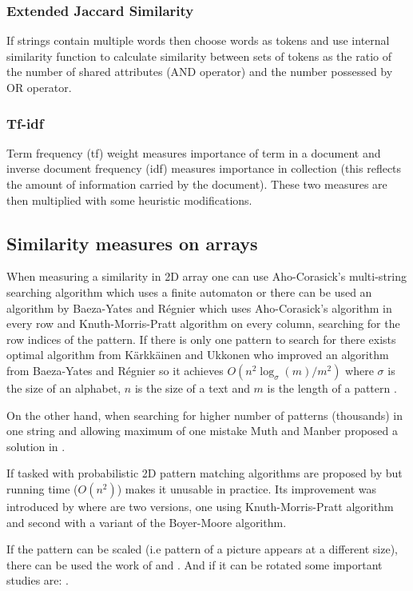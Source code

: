 \subsubsection{Extended Jaccard Similarity}
If strings contain multiple words then choose words as tokens and use internal similarity function to calculate similarity between sets of tokens as the ratio of the number of shared attributes (AND operator) and the number possessed by OR operator.
\subsubsection{Tf-idf}
Term frequency (tf) weight measures importance of term in a document and inverse document frequency (idf) measures importance in collection (this reflects the amount of information carried by the document). These two measures are then multiplied with some heuristic modifications.

\subsection{Similarity measures on arrays}
When measuring a similarity in 2D array one can use Aho-Corasick's multi-string searching algorithm \cite{ahocor} which uses a finite automaton or there can be used an algorithm by Baeza-Yates and R{\' e}gnier \cite{baeza1993fast} which uses Aho-Corasick's algorithm in every row and Knuth-Morris-Pratt algorithm on every column, searching for the row indices of the pattern. If there is only one pattern to search for there exists optimal algorithm from K{\"a}rkk{\"a}inen and Ukkonen who improved an algorithm from Baeza-Yates and R{\' e}gnier so it achieves $O(n^2 \log_\sigma (m) / m^2)$ where $\sigma$ is the size of an alphabet, $n$ is the size of a text and $m$ is the length of a pattern \cite{karkoptimal}. 

On the other hand, when searching for higher number of patterns (thousands) in one string and allowing maximum of one mistake Muth and Manber proposed a solution in \cite{1erroronly}.

If tasked with probabilistic 2D pattern matching algorithms are proposed by \cite{kr87} but running time ($O(n^2)$) makes it unusable in practice. Its improvement was introduced by \cite{zt89} where are two versions, one using Knuth-Morris-Pratt algorithm and second with a variant of the Boyer-Moore algorithm.

If the pattern can be scaled (i.e pattern of a picture appears at a different size), there can be used the work of \cite{realscaledmatch} and \cite{alphscalematch}. And if it can be rotated some important studies are: \cite{patternrotation1,patternrotation2,patternrotation3}.


